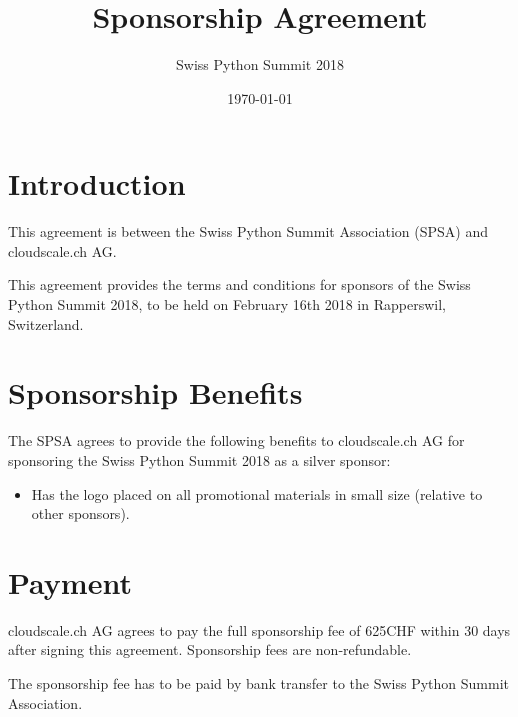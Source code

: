 \documentclass[11pt,enlargefirstpage=true,headlines=4]{scrartcl}
\title{Sponsorship Agreement}
\subtitle{Swiss Python Summit 2018}
\date{\today} %
\begin{document}
    \maketitle

    \section{Introduction}

    This agreement is between the Swiss Python Summit Association (SPSA) and
    cloudscale.ch AG.

    This agreement provides the terms and conditions for sponsors of the Swiss
    Python Summit 2018, to be held on February 16th 2018 in Rapperswil,
    Switzerland.

    \section{Sponsorship Benefits}

    The SPSA agrees to provide the following benefits to cloudscale.ch AG for sponsoring
    the Swiss Python Summit 2018 as a silver sponsor:

    \begin{itemize}
        \item Has the logo placed on all promotional materials in small size (relative to other sponsors).
    \end{itemize}

    \section{Payment}

    cloudscale.ch AG agrees to pay the full sponsorship fee of 625CHF within 30 days
    after signing this agreement. Sponsorship fees are non‐refundable.

    The sponsorship fee has to be paid by bank transfer to the Swiss Python
    Summit Association.

    \quad
\end{document}
